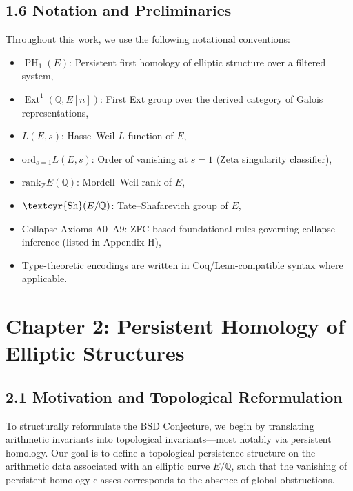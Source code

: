 \documentclass[11pt]{article}
\DeclareMathOperator{\Ext}{Ext}
\DeclareMathOperator{\PH}{PH}
\newcommand{\QQ}{\mathbb{Q}}
\newcommand{\ZZ}{\mathbb{Z}}
\newcommand{\Sha}{\text{\textcyr{Sh}}}
\begin{document}
\subsection{1.6 Notation and Preliminaries}

Throughout this work, we use the following notational conventions:

\begin{itemize}
  \item $\PH_1(E)$: Persistent first homology of elliptic structure over a filtered system,
  \item $\Ext^1(\QQ,E[n])$: First Ext group over the derived category of Galois representations,
  \item $L(E,s)$: Hasse–Weil $L$-function of $E$,
  \item $\mathrm{ord}_{s=1} L(E,s)$: Order of vanishing at $s=1$ (Zeta singularity classifier),
  \item $\mathrm{rank}_{\ZZ} E(\QQ)$: Mordell–Weil rank of $E$,
  \item $\Sha(E/\QQ)$: Tate–Shafarevich group of $E$,
  \item Collapse Axioms A0–A9: ZFC-based foundational rules governing collapse inference (listed in Appendix H),
  \item Type-theoretic encodings are written in Coq/Lean-compatible syntax where applicable.
\end{itemize}




\section{Chapter 2: Persistent Homology of Elliptic Structures}

\subsection{2.1 Motivation and Topological Reformulation}

To structurally reformulate the BSD Conjecture, we begin by translating arithmetic invariants into topological invariants—most notably via persistent homology.  
Our goal is to define a topological persistence structure on the arithmetic data associated with an elliptic curve \( E/\QQ \), such that the vanishing of persistent homology classes corresponds to the absence of global obstructions.
\end{document}
